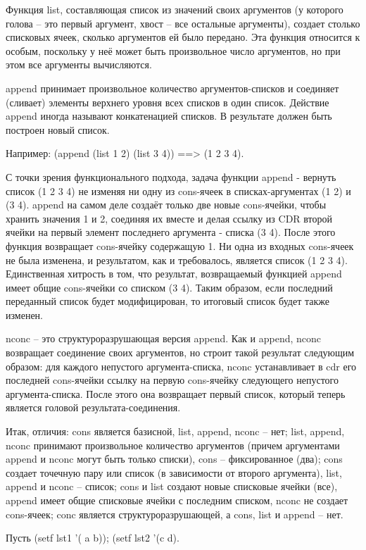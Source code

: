\documentclass[12pt]{report}
\begin{document}
Функция list, составляющая список из значений своих аргументов (у которого голова -- это первый аргумент, хвост -- все остальные аргументы), создает столько списковых ячеек, сколько аргументов ей было передано. Эта функция относится к особым, поскольку у неё может быть произвольное число аргументов, но при этом все аргументы вычисляются.

append принимает произвольное количество аргументов-списков и соединяет (сливает)  элементы верхнего уровня всех списков в один список. Действие append иногда называют конкатенацией списков. В результате должен быть построен новый список.

Например: (append (list 1 2) (list 3 4)) ==> (1 2 3 4). 

С точки зрения функционального подхода, задача функции append - вернуть список (1 2 3 4) не изменяя ни одну из cons-ячеек в списках-аргументах (1 2) и (3 4). append на самом деле создаёт только две новые cons-ячейки, чтобы хранить значения 1 и 2, соединяя их вместе и делая ссылку из CDR второй ячейки на первый элемент последнего аргумента - списка (3 4). После этого функция возвращает cons-ячейку содержащую 1. Ни одна из входных cons-ячеек не была изменена, и результатом, как и требовалось, является список (1 2 3 4). Единственная хитрость в том, что результат, возвращаемый функцией append имеет общие cons-ячейки со списком (3 4). Таким образом, если последний переданный список будет модифицирован, то  итоговый список будет также изменен.

nconc -- это структуроразрушающая версия append. Как и append, nconc возвращает соединение своих аргументов, но строит такой результат следующим образом: для каждого непустого аргумента-списка, nconc устанавливает в cdr его последней cons-ячейки ссылку на первую cons-ячейку следующего непустого аргумента-списка. После этого она возвращает первый список, который теперь является головой результата-соединения.

Итак, отличия: cons является базисной, list, append, nconc -- нет; list, append, nconc принимают произвольное количество аргументов (причем аргументами append и nconc могут быть только списки), cons -- фиксированное (два); cons создает точечную пару или список (в зависимости от второго аргумента), list, append и nconc -- список; cons и list создают новые списковые ячейки (все), append имеет общие списковые ячейки с последним списком, nconc не создает cons-ячеек; conc является структуроразрушающей, а cons, list и append -- нет.

Пусть (setf lst1 '( a b)); (setf lst2 '(c d).
\end{document}
